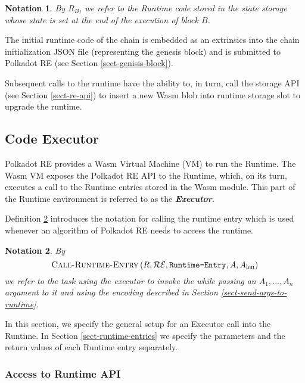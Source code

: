 \documentclass{book}
\newcommand{\tmem}[1]{{\em #1\/}}
\newcommand{\tmname}[1]{\textsc{#1}}
\newcommand{\tmop}[1]{\ensuremath{\operatorname{#1}}}
\newcommand{\tmstrong}[1]{\textbf{#1}}
\newcommand{\tmtextbf}[1]{{\bfseries{#1}}}
\newcommand{\tmtextit}[1]{{\itshape{#1}}}
\newcommand{\tmtextsc}[1]{{\scshape{#1}}}
\newcommand{\tmtexttt}[1]{{\ttfamily{#1}}}
\newcommand{\tmverbatim}[1]{{\ttfamily{#1}}}
\newtheorem{notation}{Notation}
\providecommand{\tmem}[1]{\tmtextit{#1}}
\providecommand{\tmname}[1]{\tmtextsc{#1}}
\providecommand{\tmop}[1]{\ensuremath{\mathrm{#1}}}
\providecommand{\tmstrong}[1]{\tmtextbf{#1}}
\providecommand{\tmtextbf}[1]{\tmtextbf{#1}}
\providecommand{\tmtextit}[1]{\tmtextit{#1}}
\providecommand{\tmverbatim}[1]{\tmtexttt{#1}}
\newtheorem{notation}{Notation}
\begin{document}
\begin{notation}
  \label{nota-runtime-code-at-state}By $R_B$, we refer to the Runtime code
  stored in the state storage whose state is set at the end of the execution
  of block $B$.
\end{notation}

The initial runtime code of the chain is embedded as an extrinsics into the
chain initialization JSON file (representing the genesis block) and is
submitted to Polkadot RE (see Section \ref{sect-genisis-block}).

Subsequent calls to the runtime have the ability to, in turn, call the storage
API (see Section \ref{sect-re-api}) to insert a new Wasm blob into runtime
storage slot to upgrade the runtime.

\subsection{Code Executor}

Polkadot RE provides a Wasm Virtual Machine (VM) to run the Runtime. The Wasm
VM exposes the Polkadot RE API to the Runtime, which, on its turn, executes a
call to the Runtime entries stored in the Wasm module. This part of the
Runtime environment is referred to as the {\tmem{{\tmstrong{Executor}}.}}

Definition \ref{nota-call-into-runtime} introduces the notation for calling
the runtime entry which is used whenever an algorithm of Polkadot RE needs to
access the runtime.

\begin{notation}
  \label{nota-call-into-runtime} By
  \[ \text{{\tmname{Call-Runtime-Entry}}} \left( R, \mathcal{R}\mathcal{E},
     \text{\tmverbatim{Runtime-Entry}}, A, A_{\tmop{len}} \right) \]
  we refer to the task using the executor to invoke the
  \tmverbatim{Runtime-Entry} while passing an $A_1, \ldots, A_n$ argument to
  it and using the encoding described in Section
  \ref{sect-send-args-to-runtime}.
\end{notation}

In this section, we specify the general setup for an Executor call into the
Runtime. In Section \ref{sect-runtime-entries} we specify the parameters and
the return values of each Runtime entry separately.

\subsubsection{Access to Runtime API}
\end{document}
